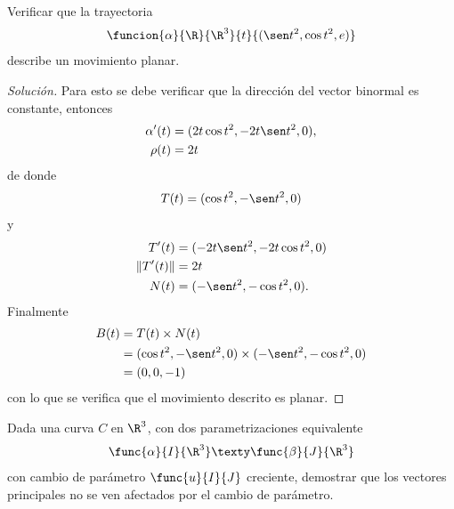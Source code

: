 \documentclass[a4,11pt]{aleph-notas}
\begin{document}
\begin{ejer}
Verificar que la trayectoria 
    \[
        \funcion{\alpha}{\R}{\R^3}{t}{(\sen t^2,\cos t^2,e)}
    \]
    describe un movimiento planar.
\end{ejer}

\begin{proof}[Solución]
Para esto se debe verificar que la dirección del vector binormal es constante, entonces
    \begin{align*}
        \alpha'(t)&=(2t\cos t^2,-2t\sen t^2,0), \\
        \rho(t)&=2t
    \end{align*}
    de donde 
    \[
        T(t)=(\cos t^2,-\sen t^2,0)
    \]
    y
    \begin{align*}
        T'(t)&=(-2t\sen t^2,-2t\cos t^2,0)\\
        \|T'(t)\|&=2t\\
        N(t)&=(-\sen t^2,-\cos t^2,0).
    \end{align*}
    Finalmente
    \begin{align*}
        B(t)&=T(t) \times N(t)\\
        &=(\cos t^2,-\sen t^2,0) \times (-\sen t^2,-\cos t^2,0)\\
        &=(0,0,-1)
    \end{align*}
    con lo que se verifica que el movimiento descrito es planar.
\end{proof}

\begin{ejer}
Dada una curva $C$ en $\R^3$, con dos parametrizaciones equivalente
    \[
        \func{\alpha}{I}{\R^3}
        \texty
        \func{\beta}{J}{\R^3}
    \]
    con cambio de parámetro $\func{u}{I}{J}$ creciente, demostrar que los vectores principales no se ven afectados por el cambio de parámetro.
\end{ejer}
\end{document}
